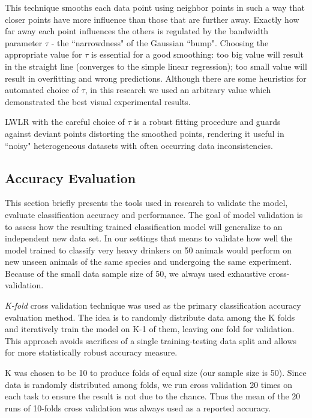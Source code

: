 	This technique smooths each data point using neighbor points in such a way that closer points have more influence than those that are further away. Exactly how far away each point influences the others is regulated by the bandwidth parameter $\tau$ - the ``narrowdness" of the Gaussian ``bump". Choosing the appropriate value for $\tau$ is  essential for a good smoothing: too big value will result in the straight line (converges to the simple linear regression); too small value will result in overfitting and wrong predictions. Although there are some heuristics for automated choice of $\tau$, in this research we used an arbitrary value which demonstrated the best visual experimental results. 
	
	LWLR with the careful choice of $\tau$ is a robust fitting procedure and guards against deviant points distorting the smoothed points, rendering it useful in ``noisy" heterogeneous datasets with often occurring data inconsistencies. 	
	
	\subsection{Accuracy Evaluation \label{section:accuracy-evaluation}}
	This section briefly presents the tools used in research to validate the model, evaluate classification accuracy and performance. The goal of model validation is to assess how the resulting trained classification model will generalize to an independent new data set. In our settings that means to validate how well the model trained to classify very heavy drinkers on 50 animals would perform on new unseen animals of the same species and undergoing the same experiment. Because of the small data sample size of 50, we always used exhaustive cross-validation.
	
	\textit{K-fold} cross validation technique was used as the primary classification accuracy evaluation method. The idea is to randomly distribute data among the K folds and iteratively train the model on K-1 of them, leaving one fold for validation.  This approach avoids sacrifices of a single training-testing data split and allows for more statistically robust accuracy measure. 
	
	K was chosen to be 10 to produce folds of equal size (our sample size is 50). Since data is randomly distributed among folds, we run cross validation 20 times on each task to ensure the result is not due to the chance. Thus the mean of the 20 runs of 10-folds cross validation was always used as a reported accuracy. 
	  

